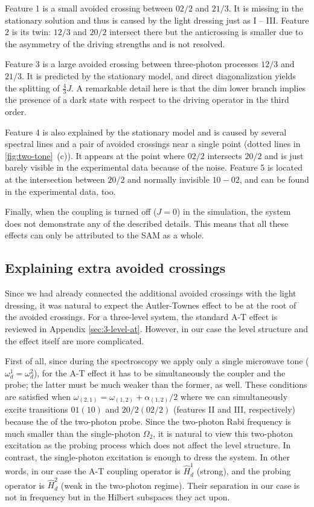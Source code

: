 \documentclass[%
 pra,
 amsmath,amssymb,
 reprint,%
]{revtex4-1}
\begin{document}
Feature 1 is a small avoided crossing between ${02/2}$ and ${21/3}$. It is missing in the stationary solution and thus is caused by the light dressing just as I -- III. Feature 2 is its twin: ${12/3}$ and ${20/2}$ intersect there but the anticrossing is smaller due to the asymmetry of the driving strengths and is not resolved. 

Feature 3 is a large avoided crossing between three-photon processes ${12/3}$ and ${21/3}$. It is predicted by the stationary model, and direct diagonalization yields the splitting of $\frac{4}{3}J$. A remarkable detail here is that the dim lower branch implies the presence of a dark state with respect to the driving operator in the third order. 

Feature 4 is also explained by the stationary model and is caused by several spectral lines and a pair of avoided crossings near a single point (dotted lines in \autoref{fig:two-tone}~(c)). It appears at the point where ${02/2}$ intersects ${20/2}$ and is just barely visible in the experimental data because of the noise. Feature 5 is located at the intersection between ${20/2}$ and normally invisible ${10} - {02}$, and can be found in the experimental data, too. 

Finally, when the coupling is turned off ($J=0$) in the simulation, the system does not demonstrate any of the described details. This means that all these effects can only be attributed to the SAM as a whole. 

\subsection{Explaining extra avoided crossings}\label{sec:theory}

Since we had already connected the additional avoided crossings with the light dressing, it was natural to expect the Autler-Townes effect to be at the root of the avoided crossings. For a three-level system, the standard A-T effect is reviewed in Appendix \ref{sec:3-level-at}. However, in our case the level structure and the effect itself are more complicated. 

First of all, since during the spectroscopy we apply only a single microwave tone ($\omega_d^1 = \omega_d^2$), for the A-T effect it has to be simultaneously the coupler and the probe; the latter must be much weaker than the former, as well. These conditions are satisfied when $\omega_{(2,1)} = \omega_{(1,2)}+\alpha_{(1,2)}/2$  where we can simultaneously excite transitions $01 (10)$ and $20/2 (02/2)$ (features II and III, respectively) because the of the two-photon probe. Since the two-photon Rabi frequency is much smaller than the single-photon $\Omega_2$, it is natural to view this two-photon excitation as the probing process which does not affect the level structure. In contrast, the single-photon excitation is enough to dress the system. In other words, in our case the A-T coupling operator is $\hat H_{d}^1$ (strong), and the probing operator is $\hat H_{d}^2$ (weak in the two-photon regime). Their separation in our case is not in frequency but in the Hilbert subspaces they act upon.
\end{document}
